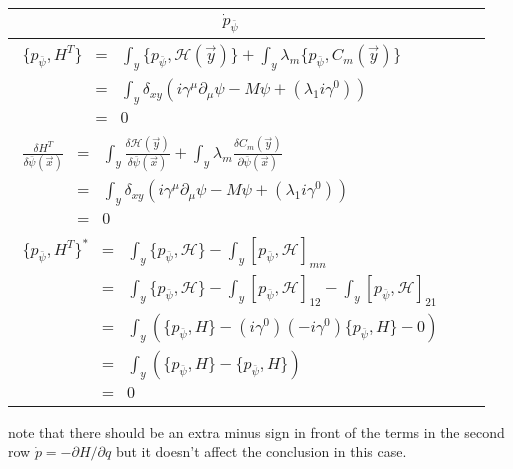 \documentclass[aps,preprint,preprintnumbers,nofootinbib,showpacs,prd]{revtex4-1}
\newcommand{\ba}{\begin{array}}
\newcommand{\ea}{\end{array}}
\begin{document}
\begin{center}
    \begin{tabular}{ | l | l |}
    \hline
    \multicolumn{1}{|c|}{$\dot p_{\overline \psi}$} \\
    \hline
    $\ba {rcl}
\{p_{\overline \psi}, H^T\} & = & \int_y \{p_{\overline \psi}, \mathcal{H}(\vec y)\} + \int_y \lambda_m \{p_{\overline \psi}, C_m(\vec y)\} \\
& = & \int_y \delta_{xy}(i\gamma^\mu\partial_\mu \psi - M\psi + (\lambda_1 i \gamma^0) ) \\
& = & 0
\ea$
      \\ \cline{1-1}
    $\ba {rcl}
\frac{\delta H^T}{\delta \overline\psi(\vec x)} & = & \int_y\frac{\delta \mathcal{H}(\vec y)}{\delta \overline \psi(\vec x)} + \int_y \lambda_m \frac{\delta C_m(\vec y)}{\partial \overline \psi(\vec x)} \\
& = & \int_y \delta_{xy}(i\gamma^\mu\partial_\mu \psi - M\psi + (\lambda_1 i \gamma^0) ) \\
& = & 0
\ea$
      \\ \cline{1-1}
   $\ba {rcl}
\{p_{\overline\psi}, H^T\}^* & = & \int_y \{p_{\overline\psi}, \mathcal{H}\} - \int_y[p_{\overline\psi}, \mathcal{H}]_{mn} \\
& = & \int_y\{p_{\overline\psi}, \mathcal{H}\} - \int_y[p_{\overline\psi}, \mathcal{H}]_{12} - \int_y[p_{\overline\psi}, \mathcal{H}]_{21}  \\
& = & \int_y(\{p_{\overline\psi}, H\} -(i \gamma^0)(-i\gamma^0)\{p_{\overline\psi}, H\} - 0) \\
& = & \int_y(\{p_{\overline\psi}, H\} -\{p_{\overline\psi}, H\}) \\
& = & 0
\ea$
     \\
    \hline
    \end{tabular}
\end{center}
note that there should be an extra minus sign in front of the terms in the second row $\dot p = -\partial H/\partial q$ but it doesn't affect the conclusion in this case.
\end{document}

